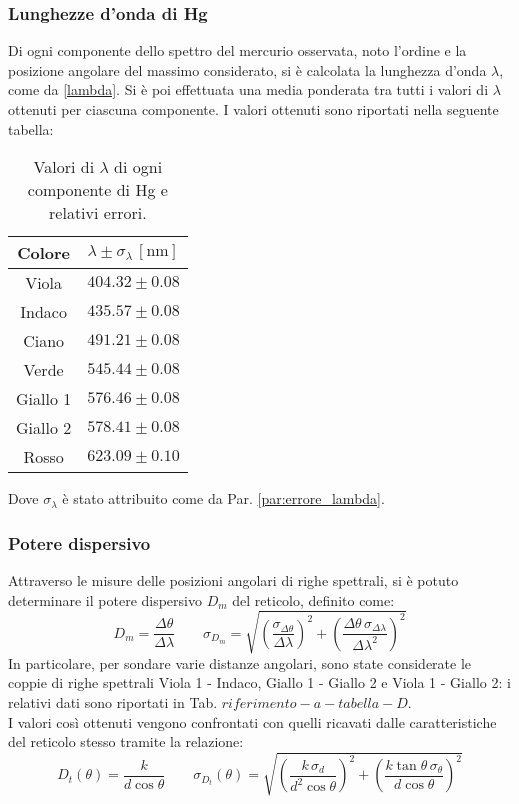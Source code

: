 \documentclass[]{article}
\begin{document}
    \subsubsection{Lunghezze d'onda di Hg}
    Di ogni componente dello spettro del mercurio osservata, noto l'ordine e la posizione angolare del massimo considerato, si è calcolata la lunghezza d'onda $\lambda$, come da \ref{lambda}. Si è poi effettuata una media ponderata tra tutti i valori di $\lambda$ ottenuti per ciascuna componente. I valori ottenuti sono riportati nella seguente tabella:
    \begin{table} [H]
        \centering
        \begin{tabular}{||c|c||}
            \hline
            Colore & $\lambda \pm \sigma_{\lambda} \, \left[\text{nm}\right] $\\
            \hline \hline
            Viola    & $ 404.32 \pm 0.08 $ \\\hline
            Indaco   & $ 435.57 \pm 0.08 $ \\\hline
            Ciano    & $ 491.21 \pm 0.08 $ \\\hline
            Verde    & $ 545.44 \pm 0.08 $ \\\hline
            Giallo 1 & $ 576.46 \pm 0.08 $ \\\hline
            Giallo 2 & $ 578.41 \pm 0.08 $ \\\hline
            Rosso    & $ 623.09 \pm 0.10 $ \\\hline
        \end{tabular}
        \caption{Valori di $\lambda$ di ogni componente di Hg e relativi errori.}
        \label{lambda-Hg-values}
    \end{table}
    Dove $\sigma_{\lambda}$ è stato attribuito come da Par. \ref{par:errore_lambda}.

    \subsubsection{Potere dispersivo}
    Attraverso le misure delle posizioni angolari di righe spettrali, si è potuto determinare il potere dispersivo $D_{m}$ del reticolo, definito come:
    \begin{equation}
        \label{D-m}
        D_m = \frac{\Delta \theta}{\Delta \lambda} \qquad \sigma_{D_m} = \sqrt{\left(\frac{\sigma_{\Delta\theta}}{\Delta\lambda}\right)^2 + \left(\frac{\Delta\theta \, \sigma_{\Delta\lambda}}{\Delta\lambda^2}\right)^2}
    \end{equation}
    In particolare, per sondare varie distanze angolari, sono state considerate le coppie di righe spettrali Viola 1 - Indaco, Giallo 1 - Giallo 2 e Viola 1 - Giallo 2: i relativi dati sono riportati in Tab. $riferimento-a-tabella-D$. \\
    I valori così ottenuti vengono confrontati con quelli ricavati dalle caratteristiche del reticolo stesso tramite la relazione:
    \begin{equation}
        \label{D-t}
        D_t(\theta) = \frac{k}{d\cos{\theta}} \qquad \sigma_{D_t}(\theta) = \sqrt{\left(\frac{k \, \sigma_d}{d^2 \cos{\theta}}\right)^2 + \left(\frac{k \tan{\theta} \, \sigma_\theta}{d\cos{\theta}}\right)^2}
    \end{equation}
\end{document}
